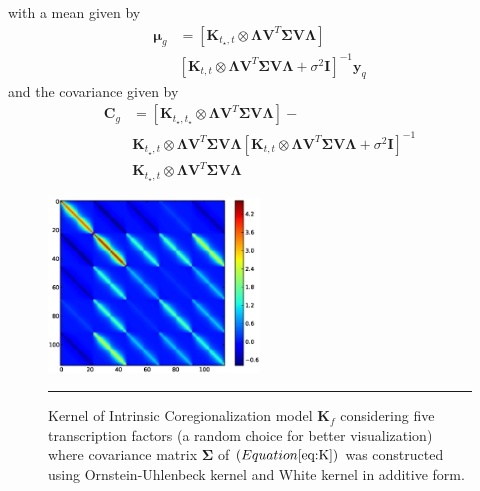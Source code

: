 with a mean given by
\begin{equation} \label{eq:prediction_MuG}
\begin{split}
\boldsymbol{\mu}_g &= 
\left[ \mathbf{K}_{t_\star,t} \otimes \boldsymbol{\Lambda} \mathbf{V}^T\boldsymbol{\Sigma} \mathbf{V} \boldsymbol{\Lambda}  \right] \\
&\left[ \mathbf{K}_{t,t} \otimes \boldsymbol{\Lambda} \mathbf{V}^T\boldsymbol{\Sigma} \mathbf{V} \boldsymbol{\Lambda} + \sigma^2 \mathbf{I} \right]^{-1}\mathbf{y}_q
\end{split}
\end{equation}
and the covariance given by
\begin{equation} \label{eq:prediction_Cg}
\begin{split}
\boldsymbol{C}_g &= 
\left[ \mathbf{K}_{t_\star,t_\star} \otimes \boldsymbol{\Lambda} \mathbf{V}^T\boldsymbol{\Sigma} \mathbf{V} \boldsymbol{\Lambda}  \right] - \\
&\mathbf{K}_{t_\star,t} \otimes \boldsymbol{\Lambda} \mathbf{V}^T\boldsymbol{\Sigma} \mathbf{V} \boldsymbol{\Lambda}  
\left[ \mathbf{K}_{t,t} \otimes \boldsymbol{\Lambda} \mathbf{V}^T\boldsymbol{\Sigma} \mathbf{V} \boldsymbol{\Lambda} + \sigma^2 \mathbf{I} \right]^{-1} \\
&\mathbf{K}_{t_\star,t} \otimes \boldsymbol{\Lambda} \mathbf{V}^T\boldsymbol{\Sigma} \mathbf{V} \boldsymbol{\Lambda} 
\end{split}
\end{equation}
\begin{figure}[!htbp]
	\centering
	\includegraphics[width=0.5\textwidth,keepaspectratio]{diagrams/kern_6TF.eps}
	\rule{25em}{0.5pt}
	\caption[Kernel of intrinsic coregionalization model $\textbf{K}_f$ considering 5 transcription factors where covariance matrix $\boldsymbol{\Sigma}$ was constructed using Ornstein-Uhlenbeck kernel and White kernel in additive form] {Kernel of Intrinsic Coregionalization model $\textbf{K}_f$ considering five transcription factors (a random choice for better visualization) where covariance matrix $\boldsymbol{\Sigma}$ of $\left( Equation \ref{eq:K} \right)$ was constructed using Ornstein-Uhlenbeck kernel and White kernel in additive form.}
	\label{fig:kern_6TF}
\end{figure}

